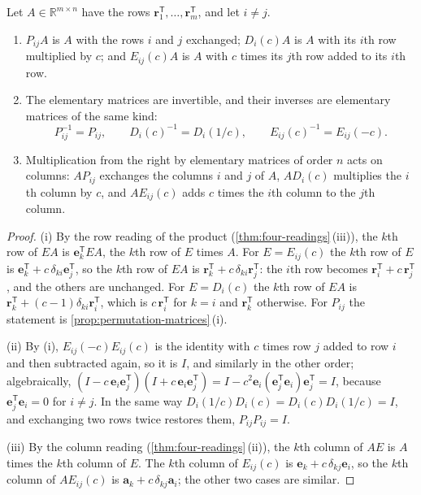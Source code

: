 \begin{proposition}
\label{prop:elementary-matrices}
Let $A\in\mathbb R^{m\times n}$ have the rows $\mathbf r_1^{\mathsf T},\ldots,\mathbf r_m^{\mathsf T}$, and let $i\ne j$.
\begin{enumerate}
\item $P_{ij}A$ is $A$ with the rows $i$ and $j$ exchanged; $D_i(c)A$ is $A$ with its $i$th row multiplied by $c$; and $E_{ij}(c)A$ is $A$ with $c$ times its $j$th row added to its $i$th row.
\item The elementary matrices are invertible, and their inverses are elementary matrices of the same kind:
\[
P_{ij}^{-1}=P_{ij},\qquad D_i(c)^{-1}=D_i(1/c),\qquad E_{ij}(c)^{-1}=E_{ij}(-c).
\]
\item Multiplication from the right by elementary matrices of order $n$ acts on columns: $AP_{ij}$ exchanges the columns $i$ and $j$ of $A$, $AD_i(c)$ multiplies the $i$th column by $c$, and $AE_{ij}(c)$ adds $c$ times the $i$th column to the $j$th column.
\end{enumerate}
\end{proposition}

\begin{proof}
(i) By the row reading of the product (\cref{thm:four-readings}\,(iii)), the $k$th row of $EA$ is $\mathbf e_k^{\mathsf T}EA$, the $k$th row of $E$ times $A$. For $E=E_{ij}(c)$ the $k$th row of $E$ is $\mathbf e_k^{\mathsf T}+c\,\delta_{ki}\mathbf e_j^{\mathsf T}$, so the $k$th row of $EA$ is $\mathbf r_k^{\mathsf T}+c\,\delta_{ki}\mathbf r_j^{\mathsf T}$: the $i$th row becomes $\mathbf r_i^{\mathsf T}+c\,\mathbf r_j^{\mathsf T}$, and the others are unchanged. For $E=D_i(c)$ the $k$th row of $EA$ is $\mathbf r_k^{\mathsf T}+(c-1)\delta_{ki}\mathbf r_i^{\mathsf T}$, which is $c\,\mathbf r_i^{\mathsf T}$ for $k=i$ and $\mathbf r_k^{\mathsf T}$ otherwise. For $P_{ij}$ the statement is \cref{prop:permutation-matrices}\,(i).

(ii) By (i), $E_{ij}(-c)E_{ij}(c)$ is the identity with $c$ times row $j$ added to row $i$ and then subtracted again, so it is $I$, and similarly in the other order; algebraically, $(I-c\,\mathbf e_i\mathbf e_j^{\mathsf T})(I+c\,\mathbf e_i\mathbf e_j^{\mathsf T})=I-c^2\mathbf e_i(\mathbf e_j^{\mathsf T}\mathbf e_i)\mathbf e_j^{\mathsf T}=I$, because $\mathbf e_j^{\mathsf T}\mathbf e_i=0$ for $i\ne j$. In the same way $D_i(1/c)D_i(c)=D_i(c)D_i(1/c)=I$, and exchanging two rows twice restores them, $P_{ij}P_{ij}=I$.

(iii) By the column reading (\cref{thm:four-readings}\,(ii)), the $k$th column of $AE$ is $A$ times the $k$th column of $E$. The $k$th column of $E_{ij}(c)$ is $\mathbf e_k+c\,\delta_{kj}\mathbf e_i$, so the $k$th column of $AE_{ij}(c)$ is $\mathbf a_k+c\,\delta_{kj}\mathbf a_i$; the other two cases are similar.
\end{proof}

